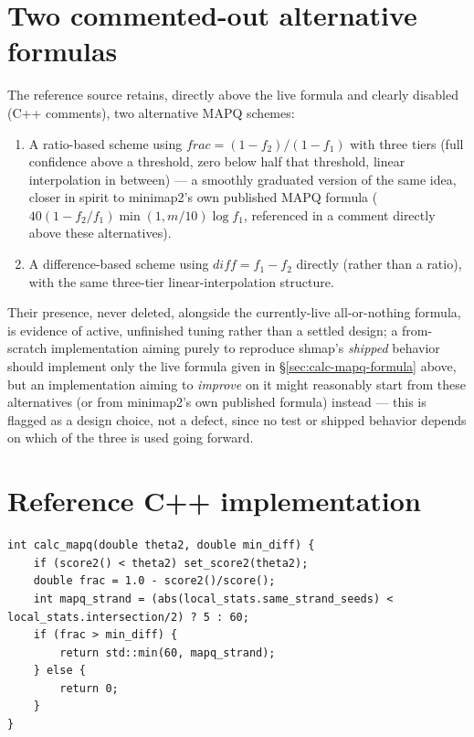 \section{Two commented-out alternative formulas}

The reference source retains, directly above the live formula and clearly disabled (C++
\code{//} comments), two alternative MAPQ schemes:

\begin{enumerate}
  \item A ratio-based scheme using $\mathit{frac} = (1-f_2)/(1-f_1)$ with three tiers (full
    confidence above a threshold, zero below half that threshold, linear interpolation in
    between) --- a smoothly graduated version of the same idea, closer in spirit to minimap2's own
    published MAPQ formula ($40(1-f_2/f_1)\min(1,m/10)\log f_1$, referenced in a comment directly
    above these alternatives).
  \item A difference-based scheme using $\mathit{diff} = f_1 - f_2$ directly (rather than a ratio),
    with the same three-tier linear-interpolation structure.
\end{enumerate}
Their presence, never deleted, alongside the currently-live all-or-nothing formula, is evidence
of active, unfinished tuning rather than a settled design; a from-scratch implementation aiming
purely to reproduce shmap's \emph{shipped} behavior should implement only the live formula given
in \S\ref{sec:calc-mapq-formula} above, but an implementation aiming to \emph{improve} on it might
reasonably start from these alternatives (or from minimap2's own published formula) instead ---
this is flagged as a design choice, not a defect, since no test or shipped behavior depends on
which of the three is used going forward.

\section{Reference C++ implementation}

\begin{lstlisting}[style=cppstyle,caption={\code{Mapping::calc\_mapq}, \texttt{src/sketch.h} (live formula; the two commented-out alternatives immediately precede it in the source and are omitted here)}]
int calc_mapq(double theta2, double min_diff) {
    if (score2() < theta2) set_score2(theta2);
    double frac = 1.0 - score2()/score();
    int mapq_strand = (abs(local_stats.same_strand_seeds) < local_stats.intersection/2) ? 5 : 60;
    if (frac > min_diff) {
        return std::min(60, mapq_strand);
    } else {
        return 0;
    }
}
\end{lstlisting}

